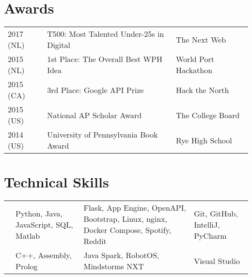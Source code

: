 \documentclass[]{deedy-resume-openfont}
\begin{document}
\begin{minipage}[t]{0.66\textwidth}
\section{Awards} 
\begin{tabular}{lll}
2017 (NL)   & T500: Most Talented Under-25s in Digital  & The Next Web\\
2015 (NL)   & 1st Place: The Overall Best WPH Idea      & World Port Hackathon\\
2015 (CA)   & 3rd Place: Google API Prize               & Hack the North\\
2015 (US)   & National AP Scholar Award                 & The College Board\\
2014 (US)   & University of Pennsylvania Book Award     & Rye High School\\
\end{tabular}
\sectionsep


\section{Technical Skills}
\vspace{-\topsep}
\begin{tabulary}{\linewidth}{LLLL}
    &  &  &  \\
    \hline
     & Python, Java, JavaScript, SQL, Matlab & Flask, App Engine, OpenAPI, Bootstrap, Linux, nginx, Docker Compose, Spotify, Reddit  & Git, GitHub, IntelliJ, PyCharm \\
    \hline
     & C++, Assembly, Prolog & Java Spark, RobotOS, Mindstorms NXT & Visual Studio \\
\end{tabulary} 

\end{minipage} 
\end{document}
